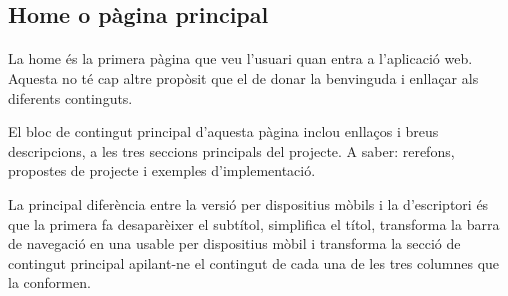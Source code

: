 \subsection{Home o pàgina principal}

    \paragraph{}
    La home és la primera pàgina que veu l'usuari quan entra a l'aplicació web. Aquesta no té cap altre propòsit que el de donar la benvinguda i enllaçar als diferents continguts.

    El bloc de contingut principal d’aquesta pàgina inclou enllaços i breus descripcions, a les tres seccions principals del projecte. A saber: rerefons, propostes de projecte i exemples d'implementació.

    La principal diferència entre la versió per dispositius mòbils i la d'escriptori és que la primera fa desaparèixer el subtítol, simplifica el títol, transforma la barra de navegació en una usable per dispositius mòbil i transforma la secció de contingut principal apilant-ne el contingut de cada una de les tres columnes que la conformen.
